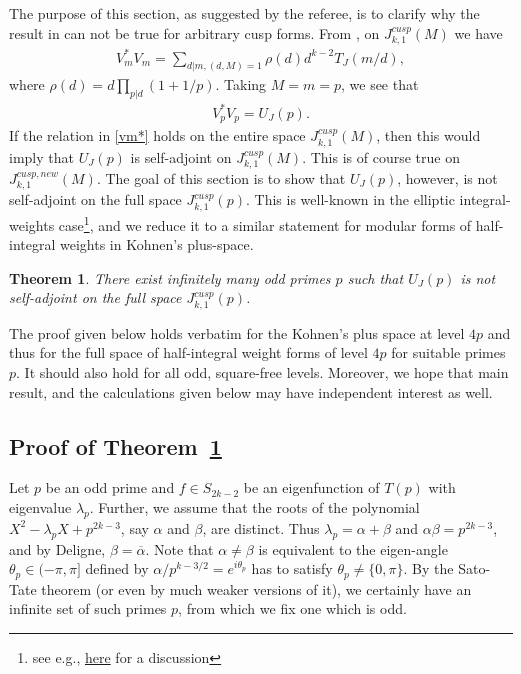 \documentclass[11pt]{amsart}
\numberwithin{equation}{section}
\theoremstyle{plain}
\newtheorem{thm}{Theorem}[section]
\theoremstyle{definition}
\begin{document}
The purpose of this section, as suggested by the referee, is to clarify why the result in \cite[Proposition 4.6]{Ag-Br} can not be true for arbitrary cusp forms. 
From \cite[Proposition 4.6]{Ag-Br}, on $J_{k,1}^{cusp}(M)$ we have
\begin{align} \label{vm*}
    V_m^* V_m = \sum_{d|m, (d,M)=1} \rho(d) d^{k-2} T_J(m/d),
\end{align}
where $\rho(d)=d\prod_{p|d}(1+1/p)$. Taking $M=m=p$, we see that
\begin{align}
 V_p^*V_p= U_J(p).   
\end{align}
If the relation in \eqref{vm*} holds on the entire space $J_{k,1}^{cusp}(M)$, then this would imply that $U_J(p)$ is self-adjoint on $J_{k,1}^{cusp}(M)$. This is of course true on $J_{k,1}^{cusp, new}(M)$. The goal of this section is to show that $U_J(p)$, however, is not self-adjoint on the full space $J_{k,1}^{cusp}(p)$. This is well-known in the elliptic integral-weights case\footnote{see e.g., \href{https://mathoverflow.net/questions/46577/adjoint-of-atkin-lehners-u-p}{here} for a discussion}, and we reduce it to a similar statement for modular forms of half-integral weights in Kohnen's plus-space.

\begin{thm} \label{ujp-notselfadj}
There exist infinitely many odd primes $p$ such that   $U_J(p)$ is not self-adjoint on the full space $J_{k,1}^{cusp}(p)$.
\end{thm}

The proof given below holds verbatim for the Kohnen's plus space at level $4p$ and thus for the full space of half-integral weight forms of level $4p$ for suitable primes $p$. It should also hold for all odd, square-free levels. Moreover, we hope that main result, and the calculations given below may have independent interest as well.


\subsection{Proof of Theorem~\ref{ujp-notselfadj}}
Let $p$ be an odd prime and $f\in S_{2k-2}$ be an eigenfunction of $T(p)$ with eigenvalue $\lambda_p$. Further, we assume that the roots of the polynomial $X^2-\lambda_p X+ p^{2k-3}$, say $\alpha$ and $\beta$, are distinct. Thus $\lambda_p= \alpha+\beta$ and $\alpha\beta=p^{2k-3}$, and by Deligne, $\beta=\overline{\alpha}$. Note that $\alpha \neq \beta$ is equivalent to the eigen-angle $\theta_p \in (-\pi, \pi]$ defined by $\alpha/p^{k-3/2}=e^{i \theta_p}$ has to satisfy $\theta_p \neq \{0, \pi\}$. By the Sato-Tate theorem (or even by much weaker versions of it), we certainly have an infinite set of such primes $p$, from which we fix one which is odd. 
\end{document}
